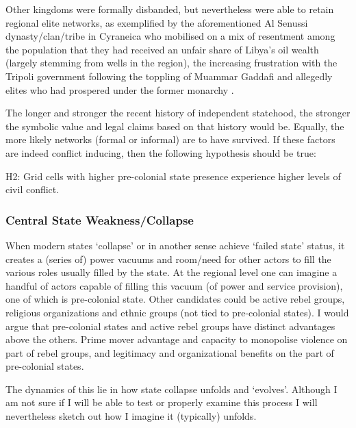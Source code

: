 \documentclass[12pt]{article}
\begin{document}
Other kingdoms were formally disbanded, but nevertheless were able to retain
regional elite networks, as exemplified by the aforementioned Al Senussi
dynasty/clan/tribe in Cyraneica who mobilised on a mix of resentment among the
population that they had received an unfair share of Libya's oil wealth (largely
stemming from wells in the region), the increasing frustration with the
Tripoli government following the toppling of Muammar Gaddafi and allegedly
elites who had prospered under the former monarchy \citep{Fetouri2012}.

The longer and stronger the recent history of independent statehood, the
stronger the symbolic value and legal claims based on that history would be.
Equally, the more likely networks (formal or informal) are to have survived. If
these factors are indeed conflict inducing, then the following hypothesis should
be true:

H2: Grid cells with higher pre-colonial state presence experience higher levels
of civil conflict. 

\subsubsection{Central State Weakness/Collapse}

When modern states `collapse' or in another sense achieve `failed state' status,
it creates a (series of) power vacuums and room/need for other actors to fill
the various roles usually filled by the state. At the regional level one can
imagine a handful of actors capable of filling this vacuum (of power and
service provision), one of which is pre-colonial state. Other candidates could
be active rebel groups, religious organizations and ethnic groups (not tied to
pre-colonial states). I would argue that pre-colonial states and active rebel
groups have distinct advantages above the others. Prime mover advantage and
capacity to monopolise violence on part of rebel groups, and legitimacy and
organizational benefits on the part of pre-colonial states.

The dynamics of this lie in how state collapse unfolds and `evolves'. Although I
am not sure if I will be able to test or properly examine this process I will
nevertheless sketch out how I imagine it (typically) unfolds.
\end{document}
